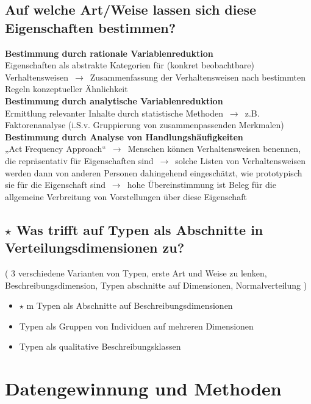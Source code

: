 \documentclass[a4paper,9pt,DIV=14]{scrartcl}
\begin{document}
\subsection{Auf welche Art/Weise lassen sich diese Eigenschaften bestimmen?}
    \textbf{Bestimmung durch rationale Variablenreduktion} \\
    Eigenschaften als abstrakte Kategorien für (konkret beobachtbare) Verhaltensweisen $\,\to\,$ Zusammenfassung der Verhaltensweisen nach bestimmten Regeln konzeptueller Ähnlichkeit\\
    \textbf{Bestimmung durch analytische Variablenreduktion} \\
    Ermittlung relevanter Inhalte durch statistische Methoden $\,\to\,$ z.B. Faktorenanalyse (i.S.v. Gruppierung von zusammenpassenden Merkmalen)\\
    \textbf{Bestimmung durch Analyse von Handlungshäufigkeiten} \\
    „Act Frequency Approach“ $\,\to\,$ Menschen können Verhaltensweisen benennen, die repräsentativ für Eigenschaften sind $\,\to\,$ solche Listen von Verhaltensweisen werden dann von anderen Personen dahingehend eingeschätzt, wie prototypisch sie für die Eigenschaft sind $\,\to\,$ hohe Übereinstimmung ist Beleg für die allgemeine Verbreitung von Vorstellungen über diese Eigenschaft
\subsection{$\star$ Was trifft auf Typen als Abschnitte in Verteilungsdimensionen zu?}%
    ( 3 verschiedene Varianten von Typen, erste Art und Weise zu lenken, Beschreibungsdimension, Typen abschnitte auf Dimensionen, Normalverteilung )
    \begin{itemize}\itemsep-0.5ex
        \item $\star$ m  Typen als Abschnitte auf Beschreibungsdimensionen %
        \item Typen als Gruppen von Individuen auf mehreren Dimensionen
        \item Typen als qualitative Beschreibungsklassen
    \end{itemize}

\section{Datengewinnung und Methoden}
\end{document}
